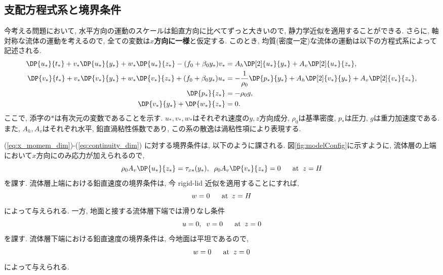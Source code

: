 \subsection{支配方程式系と境界条件}
今考える問題において, 水平方向の運動のスケールは鉛直方向に比べてずっと大きいので, 
静力学近似を適用することができる. 
さらに, 軸対称な流体の運動を考えるので, 全ての変数は\textbf{$x$方向に一様}と仮定する. 
このとき, 均質(密度一定)な流体の運動は以下の方程式系によって記述される. 
\begin{subequations}
\begin{align}
  \DP{u_*}{t_*} + v_* \DP{u_*}{y_*} + w_*\DP{u_*}{z_*} - (f_0 + \beta_0 y_*) v_* 
       &= A_h \DP[2]{u_*}{y_*} + A_v\DP[2]{u_*}{z_*}, \label{eq:x_momem_dim} \\
  \DP{v_*}{t_*} + v_* \DP{v_*}{y_*} + w_*\DP{v_*}{z_*} + (f_0 + \beta_0 y_*) u_* 
       &= - \dfrac{1}{\rho_0} \DP{p_*}{y_*} + A_h \DP[2]{v_*}{y_*} + A_v\DP[2]{v_*}{z_*}, \label{eq:y_momem_dim} \\
  \DP{p_*}{z_*} &= - \rho_0 g, \label{eq:hydrostatic_dim} \\
  \DP{v_*}{y_*} + \DP{w_*}{z_*} &= 0. \label{eq:continuity_dim}
\end{align}
\end{subequations}
ここで, 添字の$*$は有次元の変数であることを示す. 
$u_*,v_*,w_*$はそれぞれ速度の$y,z$方向成分, 
$\rho_0$は基準密度, $p_*$は圧力, $g$は重力加速度である.
また, $A_h, A_v$はそれぞれ水平, 鉛直渦粘性係数であり, 
この系の散逸は渦粘性項により表現する. 

(\ref{eq:x_momem_dim})-(\ref{eq:continuity_dim}) に対する境界条件は, 以下のように課される. 
図\ref{fig:modelConfig}に示すように, 流体層の上端において$x$方向にのみ応力が加えられるので, 
\begin{equation}
      \rho_0 A_v \DP{u_*}{z_*} = \tau_{x*}(y_*), 
 \;\; \rho_0 A_v \DP{v_*}{z_*} = 0 \;\;\;\;\;\; {\rm at} \;\; z=H
\label{eq:BC_top_hVel}
\end{equation}
を課す. 
流体層上端における鉛直速度の境界条件は, 今 rigid-lid 近似を適用することにすれば, 
\begin{equation}
  w = 0 \;\;\;\;\;\; {\rm at} \;\; z=H
\label{eq:BC_top_vVel}
\end{equation}
によって与えられる. 
一方, 地面と接する流体層下端では滑りなし条件
\begin{equation}
  u=0, \;\; v=0 \;\;\;\;\;\; {\rm at} \;\; z = 0
\label{eq:BC_btm_hVel}
\end{equation}
を課す. 
流体層下端における鉛直速度の境界条件は, 今地面は平坦であるので, 
\begin{equation}
  w = 0 \;\;\;\;\;\; {\rm at} \;\; z=0
\label{eq:BC_btm_vVel}
\end{equation}
によって与えられる. 

